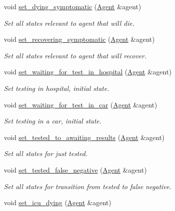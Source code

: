 \begin{DoxyCompactItemize}
void \hyperlink{classStatesManager_adcd6bc8a8f260efcf7cf43dcebe0334e}{set\+\_\+dying\+\_\+symptomatic} (\hyperlink{classAgent}{Agent} \&agent)
\begin{DoxyCompactList}\small\item\em Set all states relevant to agent that will die. \end{DoxyCompactList}\item 
void \hyperlink{classStatesManager_a01294a7aead97c9d002f202093051b81}{set\+\_\+recovering\+\_\+symptomatic} (\hyperlink{classAgent}{Agent} \&agent)
\begin{DoxyCompactList}\small\item\em Set all states relevant to agent that will recover. \end{DoxyCompactList}\item 
void \hyperlink{classStatesManager_ac3900f6b45182c5ba0103bb524df769a}{set\+\_\+waiting\+\_\+for\+\_\+test\+\_\+in\+\_\+hospital} (\hyperlink{classAgent}{Agent} \&agent)
\begin{DoxyCompactList}\small\item\em Set testing in hospital, initial state. \end{DoxyCompactList}\item 
void \hyperlink{classStatesManager_a280373c96ad5df8a9044235be2351556}{set\+\_\+waiting\+\_\+for\+\_\+test\+\_\+in\+\_\+car} (\hyperlink{classAgent}{Agent} \&agent)
\begin{DoxyCompactList}\small\item\em Set testing in a car, initial state. \end{DoxyCompactList}\item 
void \hyperlink{classStatesManager_aaf0cfd7137a490fc716af5ff5dbb4bcd}{set\+\_\+tested\+\_\+to\+\_\+awaiting\+\_\+results} (\hyperlink{classAgent}{Agent} \&agent)
\begin{DoxyCompactList}\small\item\em Set all states for just tested. \end{DoxyCompactList}\item 
void \hyperlink{classStatesManager_ad6f9193dcf05f4f37e71a94d58315481}{set\+\_\+tested\+\_\+false\+\_\+negative} (\hyperlink{classAgent}{Agent} \&agent)
\begin{DoxyCompactList}\small\item\em Set all states for transition from tested to false negative. \end{DoxyCompactList}\item 
void \hyperlink{classStatesManager_a2044045b6b2adc1a94b5d02f72272cb7}{set\+\_\+icu\+\_\+dying} (\hyperlink{classAgent}{Agent} \&agent)

\end{DoxyCompactItemize}
